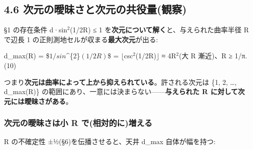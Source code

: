 \documentclass[
]{ltjsarticle}
\begin{document}
\subsection{4.6
次元の曖昧さと次元の共役量(観察)}\label{ux6b21ux5143ux306eux66d6ux6627ux3055ux3068ux6b21ux5143ux306eux5171ux5f79ux91cfux89b3ux5bdf}

§1 の存在条件 d·sin\(^{2}\)(1/2R) ≤ 1
を\textbf{次元について解く}と、与えられた曲率半径 R で辺長 1
の正則測地セルが収まる\textbf{最大次元}が出る:

d\_max(R) = \$\lfloor\(1/sin\)\^{}\{2\}\((1/2R)\)\rfloor\$ =
\(\lfloor\)csc\(^{2}\)(1/2R)\(\rfloor\) ≈ 4R\(^{2}\)(大 R 漸近)、R ≥
1/π. (10)

つまり\textbf{次元は曲率によって上から抑えられている}。許される次元は
\{1, 2, \ldots, d\_max(R)\}
の範囲にあり、一意には決まらない------\textbf{与えられた R
に対して次元には曖昧さがある}。

\subsubsection{次元の曖昧さは小 R
で(相対的に)増える}\label{ux6b21ux5143ux306eux66d6ux6627ux3055ux306fux5c0f-r-ux3067ux76f8ux5bfeux7684ux306bux5897ux3048ux308b}

R の不確定性 ±½(§6)を伝播させると、天井 d\_max 自体が幅を持つ:
\end{document}
